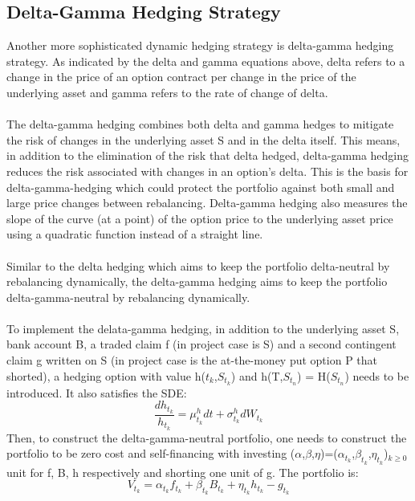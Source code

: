 \documentclass[12pt]{article}
\begin{document}
\subsection{Delta-Gamma Hedging Strategy}
Another more sophisticated dynamic hedging strategy is delta-gamma hedging strategy. As indicated by the delta and gamma equations above, delta refers to a change in the price of an option contract per change in the price of the underlying asset and gamma refers to the rate of change of delta.\\
\\The delta-gamma hedging combines both delta and gamma hedges to mitigate the risk of changes in the underlying asset S and in the delta itself. This means, in addition to the elimination of the risk that delta hedged, delta-gamma hedging reduces the risk associated with changes in an option's delta. This is the basis for delta-gamma-hedging which could protect the portfolio against both small and large price changes between rebalancing. Delta-gamma hedging also measures the slope of the curve (at a point) of the option price to the underlying asset price using a quadratic function instead of a straight line. \\
\\Similar to the delta hedging which aims to keep the portfolio delta-neutral by rebalancing dynamically, the delta-gamma hedging aims to keep the portfolio delta-gamma-neutral by rebalancing dynamically.\\
\\To implement the delata-gamma hedging, in addition to the underlying asset S, bank account B, a traded claim f (in project case is S) and a second contingent claim g written on S (in project case is the at-the-money put option P that shorted), a hedging option with value h($t_k$,$S_{t_k}$) and h(T,$S_{t_n}$) = H($S_{t_n}$) needs to be introduced. It also satisfies the SDE:
\begin{equation}
    {\frac{dh_{t_k}}{h_{t_k}}} = {\mu^h_{t_k}} {dt} + {\sigma^h_{t_k}}{dW_{t_k}}
\end{equation}
Then, to construct the delta-gamma-neutral portfolio, one needs to construct the portfolio to be zero cost and self-financing with investing (${\alpha}$,${\beta}$,${\eta}$)=(${\alpha}_{t_k}$,${\beta}_{t_k}$,${\eta}_{t_k}$)$_{k \geq 0}$ unit for f, B, h respectively and shorting one unit of g. The portfolio is:
\begin{equation}
    {V_{t_k}} = {{\alpha}_{t_k}} {f_{t_k}} + {{\beta}_{t_k}} {B_{t_k}} +{\eta}_{t_k}{h_{t_k}} - {g_{t_k}}
\end{equation}
\end{document}
